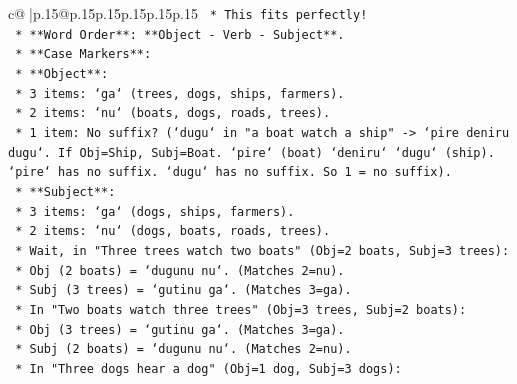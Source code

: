\documentclass{article}
\begin{document}
{\begin{supertabular}{c@{$\;$}|p{.15\linewidth}@{}p{.15\linewidth}p{.15\linewidth}p{.15\linewidth}p{.15\linewidth}p{.15\linewidth}}
{{{\texttt{                                        *   This fits perfectly!} \\
\texttt{                                        *   **Word Order**: **Object {-} Verb {-} Subject**.} \\
\texttt{                                        *   **Case Markers**:} \\
\texttt{                                            *   **Object**:} \\
\texttt{                                                *   3 items: `ga` (trees, dogs, ships, farmers).} \\
\texttt{                                                *   2 items: `nu` (boats, dogs, roads, trees).} \\
\texttt{                                                *   1 item: No suffix? (`dugu` in "a boat watch a ship" {-}> `pire deniru dugu`. If Obj=Ship, Subj=Boat. `pire` (boat) `deniru` `dugu` (ship). `pire` has no suffix. `dugu` has no suffix. So 1 = no suffix).} \\
\texttt{                                            *   **Subject**:} \\
\texttt{                                                *   3 items: `ga` (dogs, ships, farmers).} \\
\texttt{                                                *   2 items: `nu` (dogs, boats, roads, trees).} \\
\texttt{                                                *   Wait, in "Three trees watch two boats" (Obj=2 boats, Subj=3 trees):} \\
\texttt{                                                    *   Obj (2 boats) = `dugunu nu`. (Matches 2=nu).} \\
\texttt{                                                    *   Subj (3 trees) = `gutinu ga`. (Matches 3=ga).} \\
\texttt{                                                *   In "Two boats watch three trees" (Obj=3 trees, Subj=2 boats):} \\
\texttt{                                                    *   Obj (3 trees) = `gutinu ga`. (Matches 3=ga).} \\
\texttt{                                                    *   Subj (2 boats) = `dugunu nu`. (Matches 2=nu).} \\
\texttt{                                                *   In "Three dogs hear a dog" (Obj=1 dog, Subj=3 dogs):} \\
}}}
\end{supertabular}}
\end{document}
